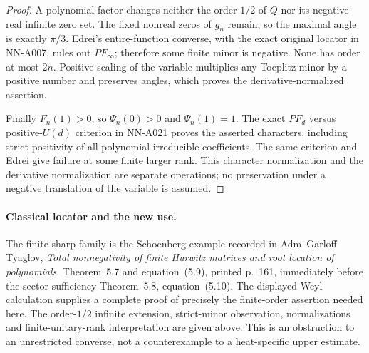 \begin{proof}
A polynomial factor changes neither the order $1/2$ of $Q$
nor its negative-real infinite zero set. The fixed nonreal
zeros of $g_n$ remain, so the maximal angle is exactly
$\pi/3$. Edrei's entire-function converse, with the exact
original locator in NN-A007, rules out $PF_\infty$;
therefore some finite minor is negative. None has order
at most $2n$. Positive scaling of the variable multiplies
any Toeplitz minor by a positive number and preserves angles,
which proves the derivative-normalized assertion.

Finally $F_n(1)>0$, so $\Psi_n(0)>0$ and $\Psi_n(1)=1$.
The exact $PF_d$ versus positive-$U(d)$ criterion in NN-A021
proves the asserted characters, including strict positivity
of all polynomial-irreducible coefficients. The same
criterion and Edrei give failure at some finite larger rank.
This character normalization and the derivative normalization
are separate operations; no preservation under a negative
translation of the variable is assumed.
\end{proof}

\paragraph{Classical locator and the new use.}
The finite sharp family is the Schoenberg example recorded in
Adm--Garloff--Tyaglov, \emph{Total nonnegativity of finite
Hurwitz matrices and root location of polynomials},
Theorem~5.7 and equation~(5.9), printed p.~161, immediately before the sector
sufficiency Theorem~5.8, equation~(5.10). The displayed Weyl
calculation supplies a complete proof of precisely the
finite-order assertion needed here. The order-$1/2$ infinite
extension, strict-minor observation, normalizations and
finite-unitary-rank interpretation are given above. This is
an obstruction to an unrestricted converse, not a counterexample
to a heat-specific upper estimate.

